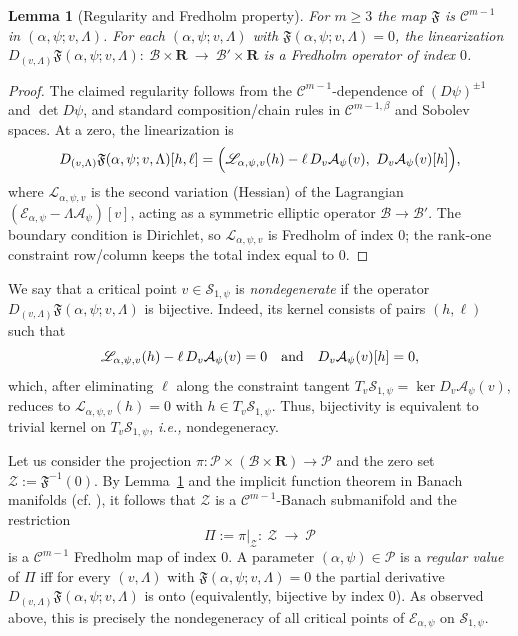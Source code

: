 \documentclass[reqno,11pt]{amsart}
\newtheorem{lemma}[theorem]{Lemma}
\theoremstyle{definition}
\begin{document}
\begin{lemma}[Regularity and Fredholm property]\label{lm:fredholm}
For $m\ge 3$ the map $\mathfrak{F}$ is $\mathcal{C}^{m-1}$ in $(\alpha,\psi;v,\Lambda)$.
For each $(\alpha,\psi;v,\Lambda)$ with $\mathfrak{F}(\alpha,\psi;v,\Lambda)=0$, the linearization 
\(D_{(v,\Lambda)}\mathfrak{F}(\alpha,\psi;v,\Lambda):\ \mathcal{B}\times\mathbf{R}\ \longrightarrow\ \mathcal{B}'\times\mathbf{R}\)
is a Fredholm operator of index $0$.
\end{lemma}

\begin{proof}
The claimed regularity follows from the $\mathcal{C}^{m-1}$-dependence of $(D\psi)^{\pm1}$ and $\det D\psi$,
and standard composition/chain rules in $\mathcal{C}^{m-1,\beta}$ and Sobolev spaces.
At a zero, the linearization is
\[
D_{(v,\Lambda)}\mathfrak{F}(\alpha,\psi;v,\Lambda)[h,\ell]
=
\Bigl(\mathscr{L}_{\alpha,\psi,v}(h)-\ell\,D_v\mathcal{A}_\psi(v),\ D_v\mathcal{A}_\psi(v)[h]\Bigr),
\]
where $\mathscr{L}_{\alpha,\psi,v}$ is the second variation (Hessian) of the Lagrangian
$(\mathcal{E}_{\alpha,\psi}-\Lambda\mathcal{A}_\psi)[v]$, acting as a symmetric elliptic operator
$\mathcal{B}\to\mathcal{B}'$. The boundary condition is Dirichlet, so $\mathscr{L}_{\alpha,\psi,v}$
is Fredholm of index $0$; the rank-one constraint row/column keeps the total index equal to $0$.
\end{proof}


We say that a critical point $v\in\mathcal{S}_{1,\psi}$ is \emph{nondegenerate} if the operator
$D_{(v,\Lambda)}\mathfrak{F}(\alpha,\psi;v,\Lambda)$ is bijective. Indeed, its kernel consists of pairs
$(h,\ell)$ such that
\[
\mathscr{L}_{\alpha,\psi,v}(h)-\ell\,D_v\mathcal{A}_\psi(v)=0
\quad {\rm and} \quad
D_v\mathcal{A}_\psi(v)[h]=0,
\]
which, after eliminating $\ell$ along the constraint tangent $T_v\mathcal{S}_{1,\psi}=
\ker D_v\mathcal{A}_\psi(v)$, reduces to $\mathscr{L}_{\alpha,\psi,v}(h)=0$ with $h\in T_v\mathcal{S}_{1,\psi}$.
Thus, bijectivity is equivalent to trivial kernel on $T_v\mathcal{S}_{1,\psi}$, {\it i.e.,} nondegeneracy.


Let us consider the projection $\pi:\mathcal{P}\times(\mathcal{B}\times\mathbf{R})\to\mathcal{P}$ and the
zero set $\mathcal{Z}:=\mathfrak{F}^{-1}(0)$. By Lemma~\ref{lm:fredholm} and the implicit function
theorem in Banach manifolds (cf. \cite[Chapter 4]{Zeidler1985}), it follows that $\mathcal{Z}$ is a $\mathcal{C}^{m-1}$-Banach submanifold and the restriction
\[
\Pi:=\pi|_{\mathcal{Z}}:\ \mathcal{Z}\ \longrightarrow\ \mathcal{P}
\]
is a $\mathcal{C}^{m-1}$ Fredholm map of index $0$. A parameter $(\alpha,\psi)\in\mathcal{P}$ is a \emph{regular
value} of $\Pi$ iff for every $(v,\Lambda)$ with $\mathfrak{F}(\alpha,\psi;v,\Lambda)=0$ the partial
derivative $D_{(v,\Lambda)}\mathfrak{F}(\alpha,\psi;v,\Lambda)$ is onto (equivalently, bijective by index
$0$). As observed above, this is precisely the nondegeneracy of all critical points of
$\mathcal{E}_{\alpha,\psi}$ on $\mathcal{S}_{1,\psi}$.
\end{document}
